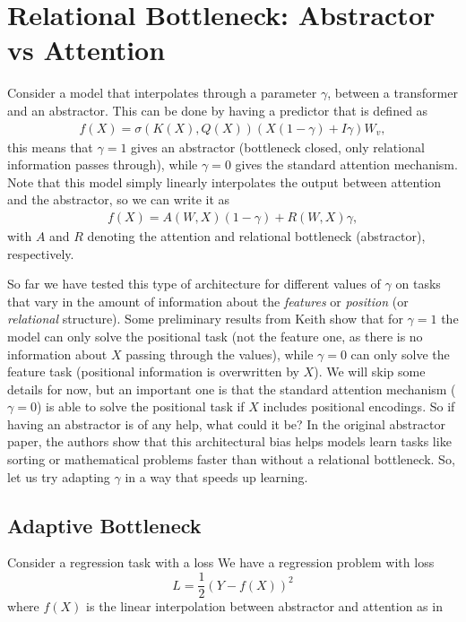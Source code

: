 \documentclass[12pt]{article}
\begin{document}
\section{Relational Bottleneck: Abstractor vs Attention}

Consider a model that interpolates through a parameter $\gamma$, between a transformer
and an abstractor. This can be done by having a predictor
that is defined as
\begin{align}
    f(X) = \sigma\left( K(X), Q(X) \right) \left(X(1-\gamma) + I\gamma\right)W_{v},
\end{align}
this means that $\gamma=1$ gives an abstractor (bottleneck closed, only relational
information passes through), while $\gamma=0$ gives the standard attention mechanism.
Note that this model simply linearly interpolates the output between attention and the
abstractor, so we can write it as
\begin{align}
    f(X) = A(W, X)(1-\gamma) + R(W, X)\gamma, \label{eq:linear_interpolation_of_architectures}
\end{align}
with $A$ and $R$ denoting the attention and relational bottleneck (abstractor),
respectively.

So far we have tested this type of architecture for different values of $\gamma$ on tasks
that vary in the amount of information about the \textit{features} or \textit{position}
(or \textit{relational} structure). Some preliminary results from Keith show that for
$\gamma=1$ the model can only solve the positional task (not the feature one, as there is
no information about $X$ passing through the values), while $\gamma=0$ can only solve the
feature task (positional information is overwritten by $X$). We will skip some details for
now, but an important one is that the standard attention mechanism ($\gamma=0$) is able to
solve the positional task if $X$ includes positional encodings. So if having an abstractor
is of any help, what could it be? In the original abstractor paper, the authors show that
this architectural bias helps models learn tasks like sorting or mathematical problems
faster than without a relational bottleneck. So, let us try adapting $\gamma$ in a way
that speeds up learning.

\subsection{Adaptive Bottleneck}

Consider a regression task with a loss
We have a regression problem with loss
\begin{equation}
    L = \frac{1}{2}\left(Y - f(X)\right)^2
\end{equation}
where $f(X)$ is the linear interpolation between abstractor and attention as in
\end{document}
